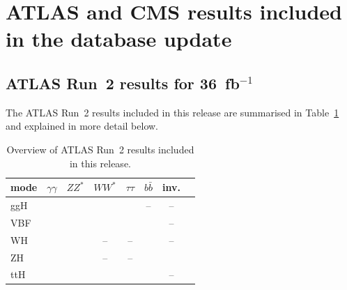 \clearpage
\section{ATLAS and CMS results included in the database update}


\subsection{ATLAS Run~2 results for 36~fb$^{-1}$}

The ATLAS Run~2 results included in this release are summarised in Table~\ref{tab:ATLASresults} and explained in more detail below.

\begin{table}[h]\centering
\begin{tabular}{l | ccccccc}
mode & $\gamma\gamma$ & $ZZ^*$ & $WW^*$ & $\tau\tau$ & $b\bar b$ & inv. \\
\hline
ggH & \cite{Aaboud:2018xdt} & \cite{Aaboud:2017vzb} & \cite{Aaboud:2018jqu} & \cite{Aaboud:2018pen} & -- & --\\
VBF &  \cite{Aaboud:2018xdt} & \cite{Aaboud:2017vzb} & \cite{Aaboud:2018jqu} & \cite{Aaboud:2018pen} & \cite{Aaboud:2018gay} & -- \\
WH & \multirow{2}{*}{\!\!\cite{Aaboud:2018xdt}} & \multirow{2}{*}{\!\!\cite{Aaboud:2017vzb}} & -- & -- & \cite{Aaboud:2017xsd} & -- \\
ZH &  &  & -- & -- & \cite{Aaboud:2017xsd} & \cite{Aaboud:2017bja} \\
ttH & \cite{Aaboud:2018xdt,Aaboud:2017jvq} & \cite{Aaboud:2017vzb,Aaboud:2017jvq} & \cite{Aaboud:2017jvq} & \cite{Aaboud:2017jvq} & \cite{Aaboud:2017jvq,Aaboud:2017rss} & -- \\ 
\end{tabular}
\caption{Overview of ATLAS Run~2 results included in this release.} 
\label{tab:ATLASresults}
\end{table}

